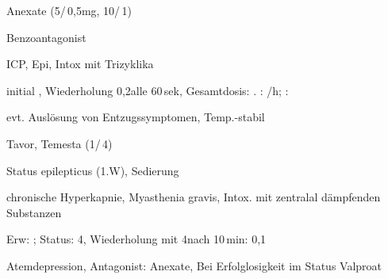 

{
\begin{MedikamentCharakteristika}
  \item[{\TxItemSpezialitaeten}] Anexate{\texttrademark} 
  (5\Ml*/\,0,5mg, 
  10\Ml*/\,1\Mg*)
  \item[Beschreibung] Benzoantagonist
  \item[{\TxItemIndikation}]  ICP, Epi, Intox mit Trizyklika
  \item[{\TxItemKontraindikation}]
  \item[{\TxItemDosierung}] initial \Mg, 
  Wiederholung 0,2\Mg* alle 
  60\,sek,
  Gesamtdosis: \Mg. : \Mg/h;
  : \,
  \item[{\TxItemAnmerkung}] evt. Auslösung von Entzugssymptomen, 
  Temp.-stabil
\end{MedikamentCharakteristika}}
{}





{
\begin{MedikamentCharakteristika}
  \item[{\TxItemSpezialitaeten}] Tavor{\texttrademark}, 
  Temesta{\texttrademark} (1\Ml*/\,4\Mg*)
  \item[{\TxItemBeschreibung}]
  \item[{\TxItemIndikation}] Status epilepticus (1.W), Sedierung
  \item[{\TxItemKontraindikation}] chronische Hyperkapnie, Myasthenia 
  gravis, Intox. mit
  zentralal dämpfenden Substanzen
  \item[{\TxItemDosierung}] Erw: \Mg; Status: 4\Mg, 
  Wiederholung mit 4\Mg* nach
  10\,min\newline {}: 0,1\MgKg
  \item[{\TxItemAnmerkung}] Atemdepression, Antagonist: Anexate, Bei 
  Erfolglosigkeit im Status
  Valproat
\end{MedikamentCharakteristika}
}
{}



